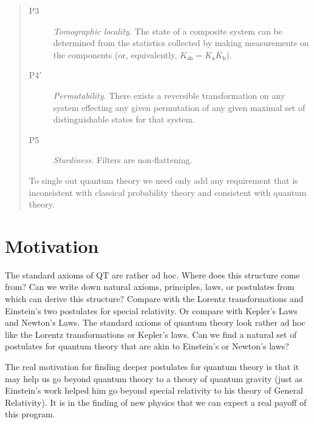 \documentclass[10pt]{article}
\begin{document}
\begin{abstract}
\begin{description}
\item[P3] \emph{Tomographic locality.} The state of a composite system can be determined from the statistics collected by making measurements on the components (or, equivalently, $K_\mathsf{ab}=K_\mathsf{a}K_\mathsf{b}$).
\item[P4$'$] \emph{Permutability.} There exists a reversible transformation on any system effecting any given permutation of any given maximal set of distinguishable states for that system.
\item[P5] \emph{Sturdiness.} Filters are non-flattening.
\end{description}
To single out quantum theory we need only add any requirement that is inconsistent with classical probability theory and consistent with quantum theory.
%
\end{abstract}









\section{Motivation}

The standard axioms of QT are rather ad hoc.  Where does this structure come from?  Can we write down natural axioms, principles, laws, or postulates from which can derive this structure?
Compare with the Lorentz transformations and Einstein's two postulates for special relativity.  Or compare with Kepler's Laws and Newton's Laws.  The standard axioms of quantum theory look rather ad hoc like the Lorentz transformations or Kepler's laws.  Can we find a natural set of postulates for quantum theory that are akin to Einstein's or Newton's laws?

The real motivation for finding deeper postulates for quantum theory is that it may help us go beyond quantum theory to a theory of quantum gravity (just as Einstein's work helped him go beyond special relativity to his theory of General Relativity).  It is in the finding of new physics that we can expect a real payoff of this program.
\end{document}

